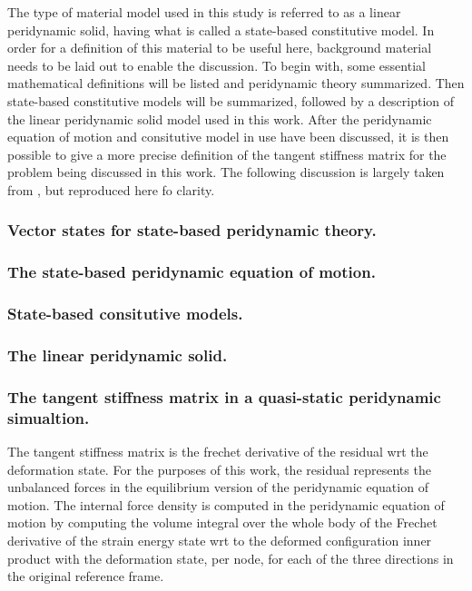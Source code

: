 \documentclass[preprint,12pt]{elsarticle}
\begin{document}
The type of material model used in this study is referred to as a linear
peridynamic solid, having what is called a state-based constitutive model. In
order for a definition of this material to be useful here, background material
needs to be laid out to enable the discussion. To begin with, some essential
mathematical definitions will be listed and peridynamic theory summarized. Then
state-based constitutive models will be summarized, followed by a description of
the linear peridynamic solid model used in this work. After the peridynamic
equation of motion and consitutive model in use have been discussed, it is then
possible to give a more precise definition of the tangent stiffness matrix for
the problem being discussed in this work. The following discussion is largely
taken from \cite{silling:psa}, but reproduced here fo clarity.

\subsubsection{Vector states for state-based peridynamic theory.}


\subsubsection{The state-based peridynamic equation of motion.}

\subsubsection{State-based consitutive models.}

\subsubsection{The linear peridynamic solid.}

\subsubsection{The tangent stiffness matrix in a quasi-static peridynamic simualtion.}
The tangent stiffness matrix is the frechet derivative of the residual wrt the
deformation state.  For the purposes of this work, the residual represents the unbalanced forces in the
equilibrium version of the peridynamic equation of motion. The internal force
density is computed in the peridynamic equation of motion by computing the
volume integral over the whole body of the Frechet derivative of the 
strain energy state wrt to the deformed configuration inner product with the deformation state, per node,
for each of the three directions in the original reference frame.
\end{document}
